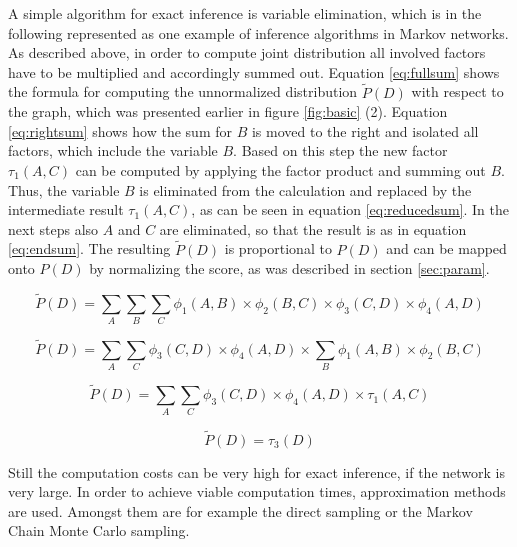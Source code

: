 A simple algorithm for exact inference is variable elimination, which is in the following represented as one example of inference algorithms in Markov networks. As described above, in order to compute joint distribution all involved factors have to be multiplied and accordingly summed out. Equation \ref{eq:fullsum} shows the formula for computing the unnormalized distribution $\widetilde{P}(D)$ with respect to the graph, which was presented earlier in figure \ref{fig:basic} (2). Equation \ref{eq:rightsum} shows how the sum for $B$ is moved to the right and isolated all factors, which include the variable $B$. Based on this step the new factor $\tau_1(A,C)$ can be computed by applying the factor product and summing out $B$. Thus, the variable $B$ is eliminated from the calculation and replaced by the intermediate result $\tau_1(A,C)$, as can be seen in equation \ref{eq:reducedsum}. In the next steps also $A$ and $C$ are eliminated, so that the result is as in equation \ref{eq:endsum}. The resulting $\widetilde{P}(D)$ is proportional to $P(D)$ and can be mapped onto $P(D)$ by normalizing the score, as was described in section \ref{sec:param}.

\begin{equation}
\widetilde{P}(D)=\sum_A{\sum_B{\sum_C{\phi_1(A,B)\times\phi_2(B,C)\times\phi_3(C,D)\times\phi_4(A,D)}}}
\label{eq:fullsum}
\end{equation}

\begin{equation}
\widetilde{P}(D)=\sum_A{\sum_C{\phi_3(C,D)\times\phi_4(A,D)\times\sum_B{\phi_1(A,B)\times\phi_2(B,C)}}}
\label{eq:rightsum}
\end{equation}

\begin{equation}
\widetilde{P}(D)=\sum_A{\sum_C{\phi_3(C,D)\times\phi_4(A,D)\times\tau_1(A,C)}}
\label{eq:reducedsum}
\end{equation}

\begin{equation}
\widetilde{P}(D)=\tau_3(D)
\label{eq:endsum}
\end{equation}


Still the computation costs can be very high for exact inference, if the network is very large. In order to achieve viable computation times, approximation methods are used. Amongst them are for example the direct sampling or the Markov Chain Monte Carlo sampling. 


